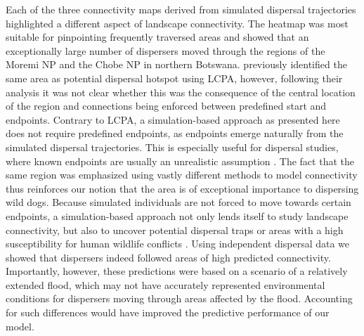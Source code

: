 \documentclass[abstract=on,10pt,a4paper,bibliography=totocnumbered]{article}
\begin{document}
Each of the three connectivity maps derived from simulated dispersal
trajectories highlighted a different aspect of landscape connectivity. The
heatmap was most suitable for pinpointing frequently traversed areas and showed
that an exceptionally large number of dispersers moved through the regions of
the Moremi NP and the Chobe NP in northern Botswana. \cite{Hofmann.2021}
previously identified the same area as potential dispersal hotspot using LCPA,
however, following their analysis it was not clear whether this was the
consequence of the central location of the region and connections being enforced
between predefined start and endpoints. Contrary to LCPA, a simulation-based
approach as presented here does not require predefined endpoints, as endpoints
emerge naturally from the simulated dispersal trajectories. This is especially
useful for dispersal studies, where known endpoints are usually an unrealistic
assumption \citep{Elliot.2014, Abrahms.2017, Cozzi.2020}. The fact that the same
region was emphasized using vastly different methods to model connectivity thus
reinforces our notion that the area is of exceptional importance to dispersing
wild dogs. Because simulated individuals are not forced to move towards certain
endpoints, a simulation-based approach not only lends itself to study landscape
connectivity, but also to uncover potential dispersal traps
\citep{VanDerMeer.2014} or areas with a high susceptibility for human wildlife
conflicts \citep{Cushman.2018}. Using independent dispersal data we showed that
dispersers indeed followed areas of high predicted connectivity. Importantly,
however, these predictions were based on a scenario of a relatively extended
flood, which may not have accurately represented environmental conditions for
dispersers moving through areas affected by the flood. Accounting for such
differences would have improved the predictive performance of our model.
\end{document}
